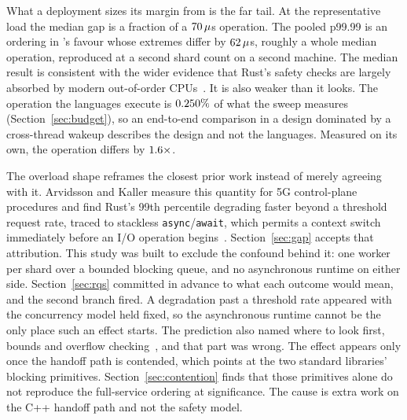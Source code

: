 \documentclass[english,oneside,a4paper,censored,csm,software-track-2020]{HYthesisML}
\begin{document}
What a deployment sizes its margin from is the far tail. At the representative load the median gap
is a fraction of a $70\,\mu$s operation. The pooled p99.99 is an ordering in
\FarTailLower{}'s favour whose extremes differ by $62\,\mu$s, roughly a whole median
operation, reproduced at a second shard count on a second machine. The median result is
consistent with the wider evidence that Rust's safety checks are largely absorbed by modern
out-of-order CPUs~\cite{balasubramanian2017rust,emmerich2019drivers}. It is also weaker than it
looks. The operation the languages execute is $0.250\%$ of what the sweep measures
(Section~\ref{sec:budget}), so an end-to-end comparison in a design dominated by a cross-thread
wakeup describes the design and not the languages. Measured on its own, the operation differs by
$1.6\times$.

The overload shape reframes the closest prior work instead of merely agreeing with it. Arvidsson
and Kaller measure this quantity for 5G control-plane procedures and find Rust's 99th percentile
degrading faster beyond a threshold request rate, traced to stackless
\texttt{async}/\texttt{await}, which permits a context switch immediately before an I/O operation
begins~\cite{arvidsson2025async}. Section~\ref{sec:gap} accepts that attribution. This study was
built to exclude the confound behind it: one worker per shard over a bounded blocking queue, and
no asynchronous runtime on either side. Section~\ref{sec:rqs} committed in advance to what each
outcome would mean, and the second branch fired. A degradation past a threshold rate appeared with
the concurrency model held fixed, so the asynchronous runtime cannot be the only place such an
effect starts. The prediction also named where to look first, bounds and overflow
checking~\cite{zhang2022runtime,harris2023morello}, and that part was wrong. The effect appears
only once the handoff path is contended, which points at the two standard libraries' blocking
primitives. Section~\ref{sec:contention} finds that those primitives alone do not reproduce the
full-service ordering at significance. The cause is extra work on the C++ handoff path and not
the safety model.
\end{document}
